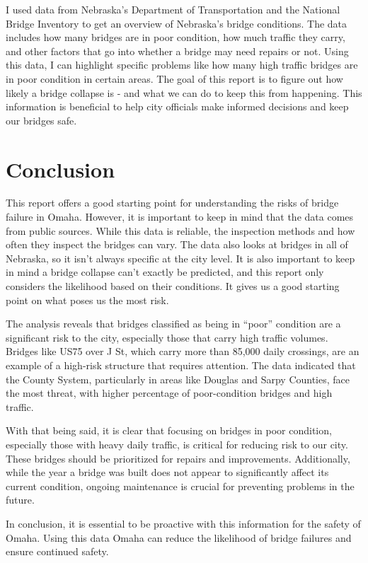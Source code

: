 \documentclass[
  letterpaper,
  DIV=11,
  numbers=noendperiod]{scrreprt}
\begin{document}
I used data from Nebraska's Department of Transportation and the
National Bridge Inventory to get an overview of Nebraska's bridge
conditions. The data includes how many bridges are in poor condition,
how much traffic they carry, and other factors that go into whether a
bridge may need repairs or not. Using this data, I can highlight
specific problems like how many high traffic bridges are in poor
condition in certain areas. The goal of this report is to figure out how
likely a bridge collapse is - and what we can do to keep this from
happening. This information is beneficial to help city officials make
informed decisions and keep our bridges safe.

\section{Conclusion}\label{conclusion-3}

This report offers a good starting point for understanding the risks of
bridge failure in Omaha. However, it is important to keep in mind that
the data comes from public sources. While this data is reliable, the
inspection methods and how often they inspect the bridges can vary. The
data also looks at bridges in all of Nebraska, so it isn't always
specific at the city level. It is also important to keep in mind a
bridge collapse can't exactly be predicted, and this report only
considers the likelihood based on their conditions. It gives us a good
starting point on what poses us the most risk.

The analysis reveals that bridges classified as being in ``poor''
condition are a significant risk to the city, especially those that
carry high traffic volumes. Bridges like US75 over J St, which carry
more than 85,000 daily crossings, are an example of a high-risk
structure that requires attention. The data indicated that the County
System, particularly in areas like Douglas and Sarpy Counties, face the
most threat, with higher percentage of poor-condition bridges and high
traffic.

With that being said, it is clear that focusing on bridges in poor
condition, especially those with heavy daily traffic, is critical for
reducing risk to our city. These bridges should be prioritized for
repairs and improvements. Additionally, while the year a bridge was
built does not appear to significantly affect its current condition,
ongoing maintenance is crucial for preventing problems in the future.

In conclusion, it is essential to be proactive with this information for
the safety of Omaha. Using this data Omaha can reduce the likelihood of
bridge failures and ensure continued safety.
\end{document}
